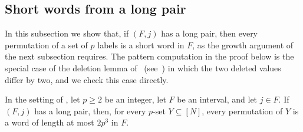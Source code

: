 \documentclass[fontsize=12pt,leading=14pt]{fullpaper}
\begin{document}
\subsection{Short words from a long pair}\label{sec:s3-short-words}

In this subsection we show that, if $(F,j)$ has a long pair, then every permutation of a set of $p$ labels is a short word in $F$, as the growth argument of the next subsection requires.
The pattern computation in the proof below is the special case of the deletion lemma of~\cite[Lemma~1]{AtkinsonBeals01} (see~\cite[Lemma~4.2]{Lehtonen20}) in which the two deleted values differ by two, and we check this case directly.

\begin{lemma}\label{lem:s3-short-words}
  In the setting of , let $p\ge2$ be an integer, let $F$ be an interval, and let $j\in F$.
  If $(F,j)$ has a long pair, then, for every $p$-set $Y\subseteq[N]$, every permutation of $Y$ is a word of length at most $2p^3$ in $F$.
\end{lemma}
\end{document}
